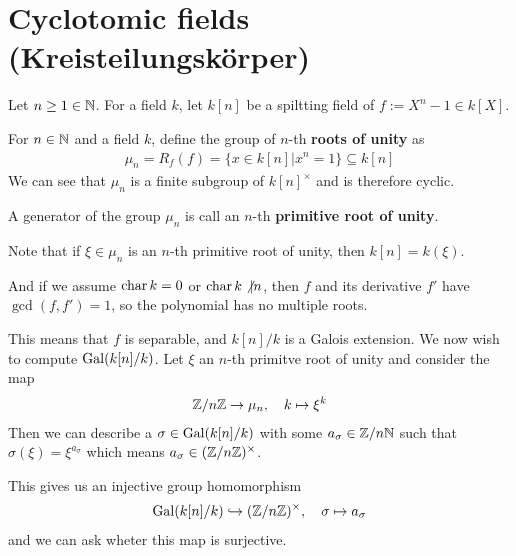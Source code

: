\section{Cyclotomic fields (Kreisteilungskörper)}
Let $n \geq 1 \in \mathbb{N}$. For a field $k$, let $k[n]$ be a spiltting field of $f := X^{n} - 1 \in k[X]$.

\begin{dfn}[]
  For $n \in \mathbb{N}$ and a field $k$, define the group of $n$-th \textbf{roots of unity} as
  \begin{align*}
    \mu_n = R_f(f) = \{x \in k[n] \big\vert x^{n} = 1\} \subseteq k[n]
  \end{align*}
  We can see that $\mu_n$ is a finite subgroup of $k[n]^{\times}$ and is therefore cyclic.

  A generator of the group $\mu_n$ is call an $n$-th \textbf{primitive root of unity}.
  
\end{dfn}
Note that if $\xi \in \mu_n$ is an $n$-th primitive root of unity, then $k[n] = k(\xi)$.

And if we assume $\operatorname{char} k = 0$ or $\operatorname{char} k\not|n$, then $f$ and its derivative $f'$ have $\gcd(f,f')=1$, so the polynomial has no multiple roots.

This means that $f$ is separable, and $k[n]/k$ is a Galois extension. 
We now wish to compute $\operatorname{Gal}(k[n]/k)$.
Let $\xi$ an $n$-th primitve root of unity and consider the map
\begin{align*}
  \mathbb{Z}/n\mathbb{Z} \to \mu_n, \quad k \mapsto \xi^{k}
\end{align*}
Then we can describe a $\sigma \in \operatorname{Gal}(k[n]/k)$ with some $a_{\sigma} \in \mathbb{Z}/n\mathbb{N}$ such that $\sigma(\xi) = \xi^{a_{\sigma}}$ which means $a_{\sigma} \in (\mathbb{Z}/n\mathbb{Z})^{\times}$.


This gives us an injective group homomorphism
\begin{align*}
  \operatorname{Gal}(k[n]/k) \hookrightarrow (\mathbb{Z}/n\mathbb{Z})^{\times}, \quad \sigma \mapsto  a_{\sigma}
\end{align*}
and we can ask wheter this map is surjective.

